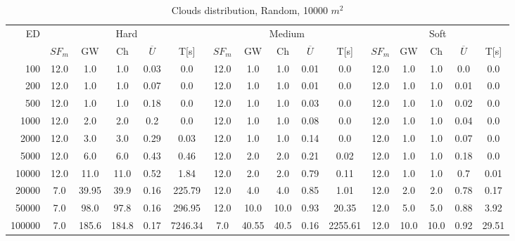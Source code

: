 \begin{table}[htb]
	\centering
	\footnotesize
	\begin{tabular}{|r|c|c|c|c|c|c|c|c|c|c|c|c|c|c|c|} 
		\hline
		\multirow{2}{*}{ED} & \multicolumn{5}{c|}{Hard} & \multicolumn{5}{c|}{Medium} &\multicolumn{5}{c|}{Soft} \\ 
		\cline{2-16} 
		&$SF_{m}$&GW & Ch & $\overline{U}$&T[s] &$SF_{m}$&GW & Ch & $\overline{U}$ &T[s] &$SF_{m}$&GW & Ch & $\overline{U}$  & T[s]  \\ 
		\hline 
		100 & 12.0 & 1.0 & 1.0 & 0.03 & 0.0 & 12.0 & 1.0 & 1.0 & 0.01 & 0.0 & 12.0 & 1.0 & 1.0 & 0.0 & 0.0\\ 
		200 & 12.0 & 1.0 & 1.0 & 0.07 & 0.0 & 12.0 & 1.0 & 1.0 & 0.01 & 0.0 & 12.0 & 1.0 & 1.0 & 0.01 & 0.0\\ 
		500 & 12.0 & 1.0 & 1.0 & 0.18 & 0.0 & 12.0 & 1.0 & 1.0 & 0.03 & 0.0 & 12.0 & 1.0 & 1.0 & 0.02 & 0.0\\ 
		1000 & 12.0 & 2.0 & 2.0 & 0.2 & 0.0 & 12.0 & 1.0 & 1.0 & 0.08 & 0.0 & 12.0 & 1.0 & 1.0 & 0.04 & 0.0\\ 
		2000 & 12.0 & 3.0 & 3.0 & 0.29 & 0.03 & 12.0 & 1.0 & 1.0 & 0.14 & 0.0 & 12.0 & 1.0 & 1.0 & 0.07 & 0.0\\ 
		5000 & 12.0 & 6.0 & 6.0 & 0.43 & 0.46 & 12.0 & 2.0 & 2.0 & 0.21 & 0.02 & 12.0 & 1.0 & 1.0 & 0.18 & 0.0\\ 
		10000 & 12.0 & 11.0 & 11.0 & 0.52 & 1.84 & 12.0 & 2.0 & 2.0 & 0.79 & 0.11 & 12.0 & 1.0 & 1.0 & 0.7 & 0.01\\ 
		20000 & 7.0 & 39.95 & 39.9 & 0.16 & 225.79 & 12.0 & 4.0 & 4.0 & 0.85 & 1.01 & 12.0 & 2.0 & 2.0 & 0.78 & 0.17\\ 
		50000 & 7.0 & 98.0 & 97.8 & 0.16 & 296.95 & 12.0 & 10.0 & 10.0 & 0.93 & 20.35 & 12.0 & 5.0 & 5.0 & 0.88 & 3.92\\ 
		100000 & 7.0 & 185.6 & 184.8 & 0.17 & 7246.34 & 7.0 & 40.55 & 40.5 & 0.16 & 2255.61 & 12.0 & 10.0 & 10.0 & 0.92 & 29.51\\ 
		\hline 
	\end{tabular} 
	\caption{Clouds distribution, Random, 10000 $m^2$} 
	\label{tab:UnRandom100} 
\end{table} 
